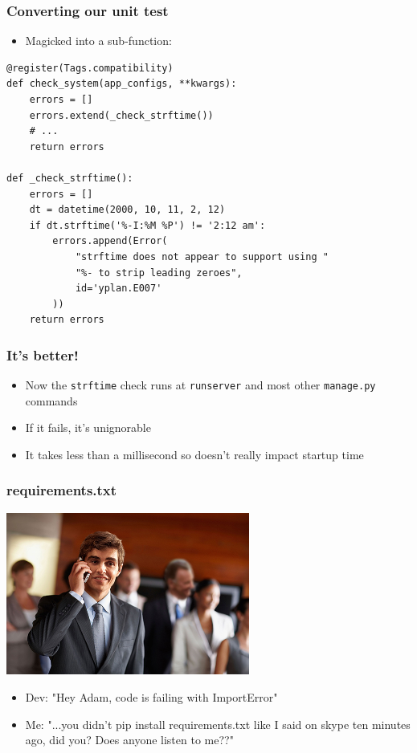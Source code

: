 \documentclass{beamer}
\begin{document}
\begin{frame}[fragile]\frametitle{Converting our unit test}

    \begin{itemize}
        \item Magicked into a sub-function:
    \end{itemize}

    \begin{lstlisting}
@register(Tags.compatibility)
def check_system(app_configs, **kwargs):
    errors = []
    errors.extend(_check_strftime())
    # ...
    return errors

def _check_strftime():
    errors = []
    dt = datetime(2000, 10, 11, 2, 12)
    if dt.strftime('%-I:%M %P') != '2:12 am':
        errors.append(Error(
            "strftime does not appear to support using "
            "%- to strip leading zeroes",
            id='yplan.E007'
        ))
    return errors
    \end{lstlisting}

\end{frame}


\begin{frame}[fragile]\frametitle{It's better!}

    \begin{itemize}
        \item Now the \texttt{strftime} check runs at \texttt{runserver} and most other \texttt{manage.py} commands
        \item If it fails, it's unignorable
        \item It takes less than a millisecond so doesn't really impact startup time
    \end{itemize}

\end{frame}


\begin{frame}[fragile]\frametitle{requirements.txt}

    \begin{center}
        \includegraphics[width=8cm]{phone-call}
    \end{center}

    \begin{itemize}
        \item Dev: "Hey Adam, code is failing with ImportError"
        \item Me: "...you didn't pip install requirements.txt like I said on skype ten minutes ago, did you? Does anyone listen to me??"
    \end{itemize}

\end{frame}
\end{document}
